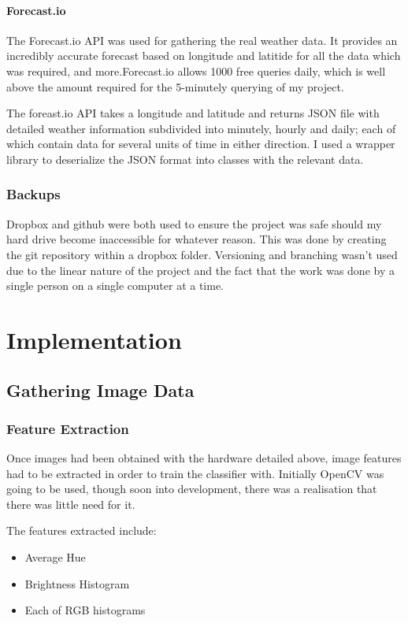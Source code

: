 \documentclass[a4paper,12pt,twoside]{report}
\begin{document}
\subsubsection{Forecast.io}
The Forecast.io\cite{x} API was used for gathering the real weather data. It provides an incredibly accurate forecast based on longitude and latitide for all the data which was required, and more.Forecast.io allows 1000 free queries daily, which is well above the amount required for the 5-minutely querying of my project.

The foreast.io API takes a longitude and latitude and returns JSON file with detailed weather information subdivided into minutely, hourly and daily; each of which contain data for several  units of time in either direction. I used a wrapper\cite{x} library to deserialize the JSON format into classes with the relevant data.

\subsection{Backups}
Dropbox\cite{x} and github\cite{x} were both used to ensure the project was safe should my hard drive become inaccessible for whatever reason. 
This was done by creating the git repository within a dropbox folder. Versioning and branching wasn't used due to the linear nature of the project and the fact that the work was done by a single person on a single computer at a time.

\chapter{Implementation}

\section{Gathering Image Data}

\subsection{Feature Extraction}
Once images had been obtained with the hardware detailed above, image features had to be extracted in order to train the classifier with. Initially OpenCV\cite{x} was going to be used, though soon into development, there was a realisation that there was little need for it.

The features extracted include:
\begin{itemize}
  \item Average Hue
  \item Brightness Histogram
  \item Each of RGB histograms
\end{itemize}
\end{document}
